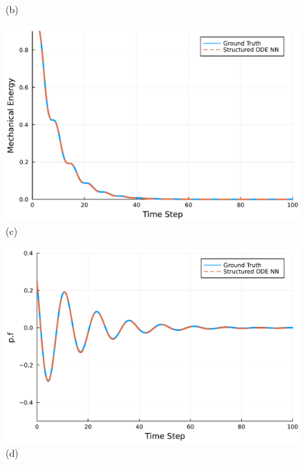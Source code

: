 \documentclass[
	parskip, 			   %
	twoside, 			   %
	DIV=14, 			   %
	BCOR=15.0mm, 		   %
	headsepline, 		   %
	open=right, 		   %
	captions=tableheading, %
	bibliography=totoc,    %
	numbers=noenddot       %
]{scrreprt}
\begin{document}
\begin{figure}[h!]
\begin{minipage}{.3\textwidth}
    \\(b)
    \end{minipage}%
    \begin{minipage}{.3\textwidth}
    \centering
    \includegraphics[width=1\linewidth]{figures/Hamiltonian_evolution_compositional_idho_reuse.pdf}
    \\(c)
    \end{minipage}
    \begin{minipage}{.3\textwidth}
    \centering
    \includegraphics[width=1\linewidth]{figures/p.f_compositional_idho_reuse.pdf}
    \\(d)
    \end{minipage}%
    \begin{minipage}{.3\textwidth}
    \centering

\end{minipage}
\end{figure}
\end{document}
